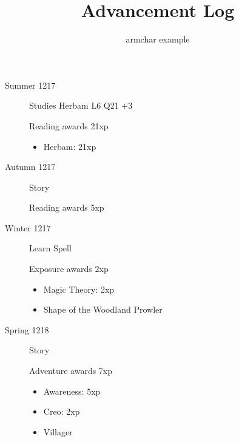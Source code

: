 \documentclass{scrartcl}
\title{Advancement Log}
\author{armchar example}
\begin{document}
\maketitle
\begin{description}
  \item[Summer 1217]
    Studies Herbam L6 Q21 +3

    Reading awards 21xp
    \begin{itemize}
      \item Herbam: 21xp
    \end{itemize}
  \item[Autumn 1217]
    Story

    Reading awards 5xp
    \begin{itemize}
    \end{itemize}
  \item[Winter 1217]
    Learn Spell

    Exposure awards 2xp
    \begin{itemize}
      \item Magic Theory: 2xp
      \item Shape of the Woodland Prowler
    \end{itemize}
  \item[Spring 1218]
    Story

    Adventure awards 7xp
    \begin{itemize}
      \item Awareness: 5xp
      \item Creo: 2xp
      \item Villager
    \end{itemize}
\end{description}
\end{document}
